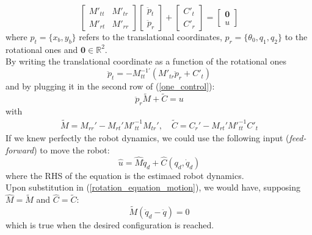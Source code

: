 \documentclass[a4paper,12pt,oneside]{report}
\begin{document}
\begin{equation}
  \begin{bmatrix}
    M'_{tt}&M'_{tr}\\
    M'_{rt}&M'_{rr}
  \end{bmatrix}
  \begin{bmatrix}
    \ddot{p}_t\\
    \ddot{p}_r
  \end{bmatrix}+\begin{bmatrix}
    C'_{t}\\
    C'_{r}
  \end{bmatrix}=\begin{bmatrix}
    \textbf{0}\\
      u
    \end{bmatrix}
    \label{one_control}
\end{equation}
where $p_t=\{x_b,y_b\}$ refers to the translational coordinates, $p_r=\{\theta_0,q_1,q_2\}$ to the rotational ones and $\textbf{0}\in \mathbb{R}^2$.\\
By writing the translational coordinate as a function of the rotational ones
\begin{equation}
  \ddot{p}_t=-M_{tt}^{-1'}(M'_{tr}\ddot{p}_r+C'_t)
\end{equation}
and by plugging it in the second row of (\ref{one_control}):
\begin{equation}
  \ddot{p}_r\tilde{M}+\tilde{C}=u
  \label{rotation_equation_motion}
\end{equation}
with
\begin{equation}
\begin{array}{c}
  \tilde{M}=M_{rr}'-M_{rt}'{M'}_{tt}^{-1}M_{tr}', \quad \tilde{C}=C_r'-M_{rt}'{M'}_{tt}^{-1}C'_t
\end{array}
\end{equation}
If we knew perfectly the robot dynamics, we could use the following input (\textit{feed-forward}) to move the robot:
\begin{equation}
  \hat{u}=\hat{M}\ddot{q}_d+\hat{C}(q_d,\dot{q}_d)
\end{equation}
where the RHS of the equation is the estimaed robot dynamics.\\
Upon substitution in (\ref{rotation_equation_motion}), we would have, supposing $\hat{M}=\tilde{M}$ and $\hat{C}=\tilde{C}$:
\begin{equation}
  \tilde{M}(\ddot{q}_d-\ddot{q})=0
\end{equation}
which is true when the desired configuration is reached.\\
\end{document}

